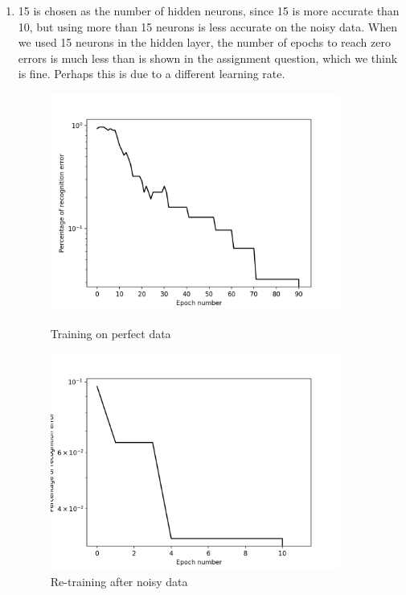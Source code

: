 \documentclass[11pt]{article}
\begin{document}
\begin{enumerate}
\begin{enumerate}
\item 15 is chosen as the number of hidden neurons, since 15 is more accurate than 10, but using more than 15 neurons is less accurate on the noisy data. When we used 15 neurons in the hidden layer, the number of epochs to reach zero errors is much less than is shown in the assignment question, which we think is fine. Perhaps this is due to a different learning rate.\\
\begin{figure}[h!]
    \centering
    \begin{minipage}{0.45\textwidth}
    	\centering
        \includegraphics[width=0.9\textwidth]{q2-b-1} %
        \caption{Training on perfect data}
    \end{minipage}\hfill
    \begin{minipage}{0.45\textwidth}
    	\centering
         \includegraphics[width=0.9\textwidth]{q2-b-2} %
         \caption{Re-training after noisy data}
    \end{minipage}\hfill
\end{figure}


\end{enumerate}
\end{enumerate}
\end{document}
